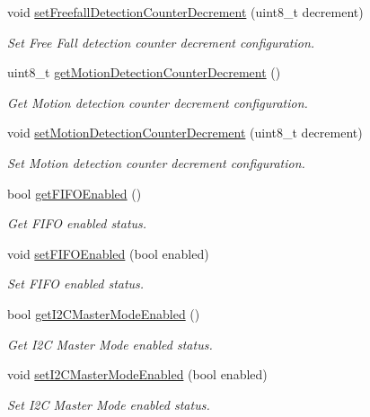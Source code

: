 \begin{DoxyCompactItemize}
void \mbox{\hyperlink{classMPU6050_a18dd79b7c53600e9ce97eed4bfe6cf15}{set\+Freefall\+Detection\+Counter\+Decrement}} (uint8\+\_\+t decrement)
\begin{DoxyCompactList}\small\item\em Set Free Fall detection counter decrement configuration. \end{DoxyCompactList}\item 
uint8\+\_\+t \mbox{\hyperlink{classMPU6050_a0ed8de8eb440dbfdec829297527b0da6}{get\+Motion\+Detection\+Counter\+Decrement}} ()
\begin{DoxyCompactList}\small\item\em Get Motion detection counter decrement configuration. \end{DoxyCompactList}\item 
void \mbox{\hyperlink{classMPU6050_a74cc3ea727afa5d4406175085e60d08c}{set\+Motion\+Detection\+Counter\+Decrement}} (uint8\+\_\+t decrement)
\begin{DoxyCompactList}\small\item\em Set Motion detection counter decrement configuration. \end{DoxyCompactList}\item 
bool \mbox{\hyperlink{classMPU6050_ae2687a09ebe0d7fbbf74f560e0dd9a44}{get\+F\+I\+F\+O\+Enabled}} ()
\begin{DoxyCompactList}\small\item\em Get F\+I\+FO enabled status. \end{DoxyCompactList}\item 
void \mbox{\hyperlink{classMPU6050_a78e58ab27986db6999af775ed4d43091}{set\+F\+I\+F\+O\+Enabled}} (bool enabled)
\begin{DoxyCompactList}\small\item\em Set F\+I\+FO enabled status. \end{DoxyCompactList}\item 
bool \mbox{\hyperlink{classMPU6050_a6b45e538f2082eb1b1975ed56e3e21bc}{get\+I2\+C\+Master\+Mode\+Enabled}} ()
\begin{DoxyCompactList}\small\item\em Get I2C Master Mode enabled status. \end{DoxyCompactList}\item 
void \mbox{\hyperlink{classMPU6050_a6503f0fdfefa0fd287a75032667b7b69}{set\+I2\+C\+Master\+Mode\+Enabled}} (bool enabled)
\begin{DoxyCompactList}\small\item\em Set I2C Master Mode enabled status. \end{DoxyCompactList}\item 

\end{DoxyCompactItemize}
